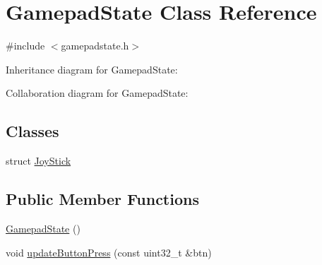 \hypertarget{class_gamepad_state}{}\section{Gamepad\+State Class Reference}
\label{class_gamepad_state}


{\ttfamily \#include $<$gamepadstate.\+h$>$}



Inheritance diagram for Gamepad\+State\+:


Collaboration diagram for Gamepad\+State\+:
\subsection*{Classes}
\begin{DoxyCompactItemize}
\item 
struct \mbox{\hyperlink{struct_gamepad_state_1_1_joy_stick}{Joy\+Stick}}
\end{DoxyCompactItemize}
\subsection*{Public Member Functions}
\begin{DoxyCompactItemize}
\item 
\mbox{\hyperlink{class_gamepad_state_a19dc3a6b4a29356bdc443d230d05807c}{Gamepad\+State}} ()
\item 
void \mbox{\hyperlink{class_gamepad_state_a58090623c824c3268a30764364c79a35}{update\+Button\+Press}} (const uint32\+\_\+t \&btn)
\end{DoxyCompactItemize}
